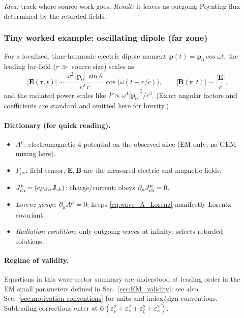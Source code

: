 \noindent\emph{Idea:} track where source work goes. \;
\emph{Result:} it leaves as outgoing Poynting flux determined by the retarded fields.

\subsubsection{Tiny worked example: oscillating dipole (far zone)}
For a localized, time-harmonic electric dipole moment \( \mathbf p(t)=\mathbf p_0\cos\omega t\),
the leading far-field (\(r\gg\) source size) scales as
\begin{equation}
\big|\mathbf E(\mathbf r,t)\big| \sim \frac{\omega^2\,|\mathbf p_0|\,\sin\theta}{c^2\,r}\,
\cos\!\big(\omega(t-r/c)\big), \qquad
\big|\mathbf B(\mathbf r,t)\big| \sim \frac{|\mathbf E|}{c},
\end{equation}
and the radiated power scales like \(P \propto \omega^4 |\mathbf p_0|^2/c^3\).
(Exact angular factors and coefficients are standard and omitted here for brevity.)

\paragraph{Dictionary (for quick reading).}
\begin{itemize}
\item \(A^\mu\): electromagnetic 4-potential on the observed slice (EM only; no GEM mixing here).
\item \(F_{\mu\nu}\): field tensor; \(\mathbf E,\mathbf B\) are the measured electric and magnetic fields.
\item \(J^\mu_{\rm ch}=(c\rho_{\rm ch},\mathbf J_{\rm ch})\): charge/current; obeys \(\partial_\mu J^\mu_{\rm ch}=0\).
\item \emph{Lorenz gauge}: \(\partial_\mu A^\mu=0\); keeps \eqref{eq:wave_A_Lorenz} manifestly Lorentz-covariant.
\item \emph{Radiation condition}: only outgoing waves at infinity; selects retarded solutions.
\end{itemize}

\paragraph{Regime of validity.}
Equations in this wave-sector summary are understood at leading order in the EM small parameters defined in Sec.~\ref{sec:EM_validity}; see also Sec.~\ref{sec:motivation-conventions} for units and index/sign conventions. Subleading corrections enter at $\mathcal O(\varepsilon_\rho^2+\varepsilon_v^2+\varepsilon_\xi^2+\varepsilon_\kappa^2)$.
